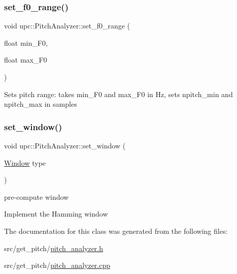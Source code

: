 \subsubsection{\texorpdfstring{set\+\_\+f0\+\_\+range()}{set\_f0\_range()}}
{\footnotesize\ttfamily void upc\+::\+Pitch\+Analyzer\+::set\+\_\+f0\+\_\+range (\begin{DoxyParamCaption}\item[{float}]{min\+\_\+\+F0,  }\item[{float}]{max\+\_\+\+F0 }\end{DoxyParamCaption})}

Sets pitch range\+: takes min\+\_\+\+F0 and max\+\_\+\+F0 in Hz, sets npitch\+\_\+min and npitch\+\_\+max in samples \mbox{\label{classupc_1_1PitchAnalyzer_a96cc042a650825b25ca39c41beebd0db}} 
\subsubsection{\texorpdfstring{set\+\_\+window()}{set\_window()}}
{\footnotesize\ttfamily void upc\+::\+Pitch\+Analyzer\+::set\+\_\+window (\begin{DoxyParamCaption}\item[{\hyperlink{classupc_1_1PitchAnalyzer_ab82b7694d6bc72839e5be6e526be81b6}{Window}}]{type }\end{DoxyParamCaption})}



pre-\/compute window 

Implement the Hamming window 

The documentation for this class was generated from the following files\+:\begin{DoxyCompactItemize}
\item 
src/get\+\_\+pitch/\hyperlink{pitch__analyzer_8h}{pitch\+\_\+analyzer.\+h}\item 
src/get\+\_\+pitch/\hyperlink{pitch__analyzer_8cpp}{pitch\+\_\+analyzer.\+cpp}\end{DoxyCompactItemize}
